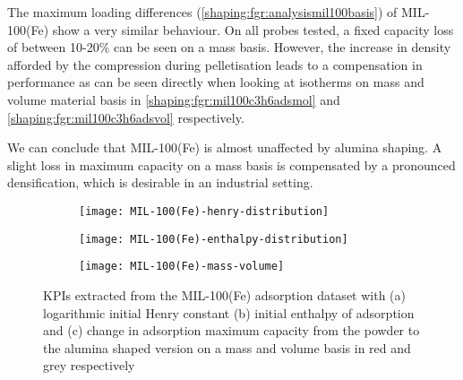 The maximum loading differences (\autoref{shaping:fgr:analysismil100basis})
of MIL-100(Fe) show a very similar behaviour.
On all probes tested, a fixed capacity
loss of between 10-20\% can be seen on a mass
basis. However, the increase in density afforded by the
compression during pelletisation leads to a compensation in
performance as can be seen directly when looking at isotherms on mass and
volume material basis in \autoref{shaping:fgr:mil100c3h6adsmol} and
\autoref{shaping:fgr:mil100c3h6adsvol} respectively.

We can conclude that MIL-100(Fe) is almost unaffected by alumina shaping.
A slight loss in maximum capacity on a mass basis is compensated by a pronounced densification, which is desirable in an industrial setting.

\begin{figure}
	\centering
	\begin{subfigure}{\linewidth}
		\parbox[c]{0.1\linewidth}{\caption{}%
			\label{shaping:fgr:analysismil100henry}}%
		\parbox[b]{0.8\linewidth}{%
			\texttt{[image: MIL-100(Fe)-henry-distribution]}%
		}%
	\end{subfigure}

	\begin{subfigure}{\linewidth}
		\parbox[c]{0.1\linewidth}{\caption{}%
			\label{shaping:fgr:analysismil100enth}}%
		\parbox[b]{0.8\linewidth}{%
			\texttt{[image: MIL-100(Fe)-enthalpy-distribution]}%
		}%
	\end{subfigure}

	\begin{subfigure}{\linewidth}
		\parbox[c]{0.1\linewidth}{\caption{}%
			\label{shaping:fgr:analysismil100basis}}%
		\parbox[b]{0.8\linewidth}{%
			\texttt{[image: MIL-100(Fe)-mass-volume]}%
		}%
	\end{subfigure}

	\caption{KPIs extracted from the MIL-100(Fe) adsorption dataset with
		(a) logarithmic initial Henry constant (b) initial enthalpy of
		adsorption and (c) change in adsorption maximum capacity from the powder
		to the alumina shaped version on a mass and volume basis in red and grey
		respectively}%
	\label{shaping:fgr:analysismil100}
\end{figure}
